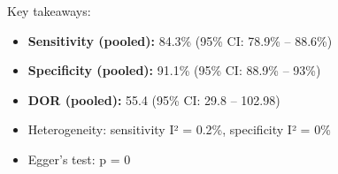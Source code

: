 \documentclass[
  letterpaper,
  DIV=11,
  numbers=noendperiod]{scrartcl}
\providecommand{\tightlist}{%
  \setlength{\itemsep}{0pt}\setlength{\parskip}{0pt}}
\begin{document}
Key takeaways:

\begin{itemize}
\tightlist
\item
  \textbf{Sensitivity (pooled):} 84.3\% (95\% CI: 78.9\% -- 88.6\%)
\item
  \textbf{Specificity (pooled):} 91.1\% (95\% CI: 88.9\% -- 93\%)
\item
  \textbf{DOR (pooled):} 55.4 (95\% CI: 29.8 -- 102.98)
\item
  Heterogeneity: sensitivity I² = 0.2\%, specificity I² = 0\%
\item
  Egger's test: p = 0
\end{itemize}
\end{document}

